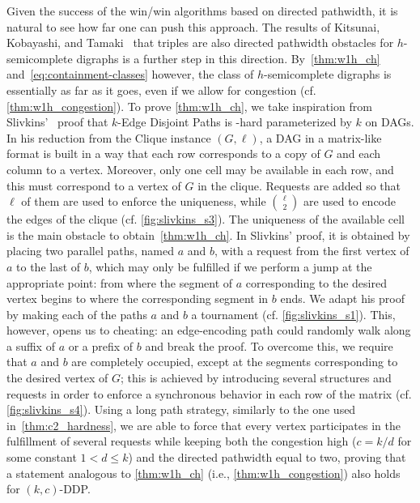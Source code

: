 \documentclass[a4paper,UKenglish,cleveref, autoref, thm-restate]{lipics-v2021}
\newcommand{\pname}[1]{{\sc #1}}
\newcommand{\congestion}{c}
\begin{document}
Given the success of the win/win algorithms based on directed pathwidth, it is natural to see how far one can push this approach. The results of Kitsunai, Kobayashi, and Tamaki~\cite{KitsunaiKT15} that triples are also directed pathwidth obstacles for $h$-semicomplete digraphs is a further step in this direction. By~\autoref{thm:w1h_ch} and~\autoref{eq:containment-classes} however, the class of $h$-semicomplete digraphs is essentially as far as it goes, even if we allow for congestion (cf. \autoref{thm:w1h_congestion}). To prove \autoref{thm:w1h_ch}, we take inspiration from Slivkins'~\cite{Slivkins2010} proof that \pname{$k$-Edge Disjoint Paths} is \W[1]-hard parameterized by $k$ on DAGs.
In his reduction from the \pname{Clique} instance $(G,\ell)$, a DAG in a matrix-like format is built in a way that each row corresponds to a copy of $G$ and each column to a vertex. Moreover, only one cell may be available in each row, and this must correspond to a vertex of $G$ in the clique. Requests are added so that $\ell$ of them are used to enforce the uniqueness, while $\binom{\ell}{2}$ are used to encode the edges of the clique (cf. \autoref{fig:slivkins_s3}).
The uniqueness of the available cell is the main obstacle to obtain~\autoref{thm:w1h_ch}. In Slivkins' proof, it is obtained by placing two parallel paths, named $a$ and $b$, with a request from the first vertex of $a$ to the last of $b$, which may only be fulfilled if we perform a jump at the appropriate point: from where the segment of $a$ corresponding to the desired vertex begins to where the corresponding segment in $b$ ends.
We adapt his proof by making each of the paths $a$ and $b$ a tournament (cf. \autoref{fig:slivkins_s1}). This, however, opens us to cheating: an edge-encoding path could randomly walk along a suffix of $a$ or a prefix of $b$ and break the proof.
To overcome this, we require that $a$ and $b$ are completely occupied, except at the segments corresponding to the desired vertex of $G$; this is achieved by introducing several structures and requests in order to enforce a synchronous behavior in each row of the matrix (cf. \autoref{fig:slivkins_s4}).
Using a long path strategy, similarly to the one used in~\autoref{thm:c2_hardness}, we are able to force that every vertex participates in the fulfillment of several requests while keeping both the congestion high ($\congestion = k/d$ for some constant $1 < d \leq k$) and the directed pathwidth equal to two, proving that a statement analogous to \autoref{thm:w1h_ch} (i.e., \autoref{thm:w1h_congestion}) also holds for \pname{$(k,c)$-DDP}.
\end{document}
